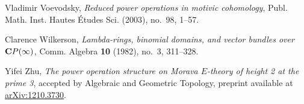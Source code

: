 \documentclass{rs}
\theoremstyle{definition}
\theoremstyle{remark}
\begin{document}
\begin{thebibliography}
Vladimir Voevodsky, \emph{Reduced power operations in motivic cohomology},
  Publ. Math. Inst. Hautes \'Etudes Sci. (2003), no.~98, 1--57. 

Clarence Wilkerson, \emph{Lambda-rings, binomial domains, and vector bundles
  over {${\bf C}P(\infty )$}}, Comm. Algebra \textbf{10} (1982), no.~3,
  311--328. 

Yifei Zhu, \emph{The power operation structure on {M}orava ${E}$-theory of
  height 2 at the prime 3}, accepted by Algebraic and Geometric Topology,
  preprint available at \href{http://arxiv.org/abs/1210.3730}{arXiv:1210.3730}.

\end{thebibliography}
\end{document}
